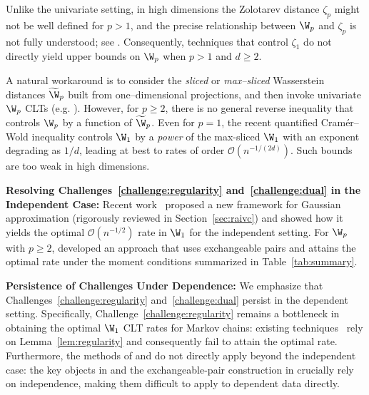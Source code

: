 \documentclass[mnsc,nonblindrev]{informs3}
\begin{document}
\begin{challenge}\label{challenge:dual}
Unlike the univariate setting, in high dimensions the Zolotarev distance $\zeta_p$
might not be well defined for $p>1$, and the precise relationship between $\W_p$ and $\zeta_p$
is not fully understood; see \cite{bobkov2024fourier}. Consequently, techniques that control
$\zeta_1$ do not directly yield upper bounds on $\W_p$ when $p>1$ and $d \geq 2$.
\end{challenge}
A natural workaround is to consider the
\emph{sliced} or \emph{max–sliced} Wasserstein distances \(\widetilde \W_p\) built from one–dimensional
projections, and then invoke univariate \(\W_p\) CLTs (e.g. \cite{liu2023wasserstein}). However, for \(p\ge2\), there is no general reverse inequality that controls \(\W_p\) by a function of \(\widetilde \W_p\).
Even for $p=1$, the recent quantified Cramér–Wold inequality \citep{bobkov2024quantified} controls $\W_1$ by a \emph{power} of the max-sliced $\W_1$ with an exponent degrading as $1/d$, leading at best to rates of order $\mathcal{O}(n^{-1/(2d)})$. Such bounds are
too weak in high dimensions.

\noindent\textbf{Resolving Challenges~\ref{challenge:regularity} and~\ref{challenge:dual} in the Independent Case:} Recent work~\citep{raivc2018multivariate} proposed a new framework for Gaussian approximation
(rigorously reviewed in Section~\ref{sec:raivc}) and showed how
it yields the optimal $\mathcal{O}(n^{-1/2})$ rate in $\W_1$ for the independent setting. For $\W_p$ with $p\ge 2$, \cite{bonis2020stein} developed an approach that uses  exchangeable pairs and attains the optimal rate under
the moment conditions summarized in Table~\ref{tab:summary}.

\noindent\textbf{Persistence of Challenges Under Dependence:} We emphasize that Challenges~\ref{challenge:regularity} and~\ref{challenge:dual} persist in
the dependent setting. Specifically, Challenge~\ref{challenge:regularity} remains a bottleneck in obtaining the optimal
$\W_1$ CLT rates for Markov chains: existing techniques~\citep{srikant2024rates,wu2025uncertainty} rely on Lemma~\ref{lem:regularity} and consequently fail to attain the optimal rate. Furthermore, the methods of
\cite{raivc2018multivariate} and \cite{bonis2020stein} do not directly apply beyond the independent case:
the key objects in \cite{raivc2018multivariate} and the exchangeable-pair construction in \cite{bonis2020stein} crucially rely on independence, making them difficult to apply to dependent data directly. 
\end{document}
